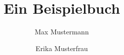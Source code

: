 \documentclass{book}
\title{Ein Beispielbuch}
\author{Max Mustermann \and Erika Musterfrau}
\begin{document}
\frontmatter


\mainmatter{}


\appendix


\backmatter{}
\printbibliography{}
\newpage

\end{document}
